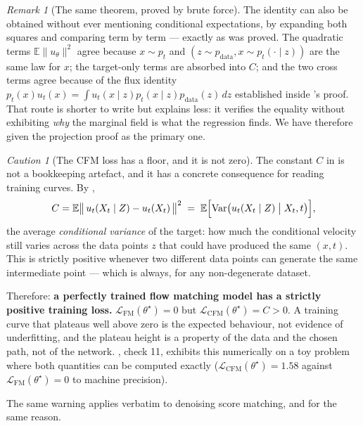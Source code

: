 \documentclass[11pt,a4paper]{report}
\theoremstyle{definition}
\theoremstyle{remark}
\newtheorem{remark}[remark]{Remark}
\newtheorem{caution}[caution]{Caution}
\DeclareMathOperator{\Var}{Var}
\newcommand{\EE}{\mathbb E}
\begin{document}
\begin{remark}[The same theorem, proved by brute force]
\label{rem:cfm-direct-proof}
The identity can also be obtained without ever mentioning conditional
expectations, by expanding both squares and comparing term by term ---
exactly as  was proved. The quadratic terms
$\EE\|u_\theta\|^2$ agree because $x\sim p_t$ and
$(z\sim p_{\mathrm{data}},x\sim p_t(\cdot\mid z))$ are the same law for
$x$; the target-only terms are absorbed into $C$; and the two cross terms
agree because of the flux identity
$p_t(x)u_t(x)=\int u_t(x\mid z)p_t(x\mid z)p_{\mathrm{data}}(z)\,dz$
established inside 's proof. That
route is shorter to write but explains less: it verifies the equality
without exhibiting \emph{why} the marginal field is what the regression
finds. We have therefore given the projection proof as the primary one.
\end{remark}

\begin{caution}[The CFM loss has a floor, and it is not zero]
\label{caution:cfm-floor}
The constant $C$ in  is not a bookkeeping
artefact, and it has a concrete consequence for reading training curves.
By ,
\[
C = \EE\bigl\|\,u_t(X_t\mid Z) - u_t(X_t)\,\bigr\|^2
\;=\;\EE\Bigl[\Var\bigl(u_t(X_t\mid Z)\;\big|\;X_t,t\bigr)\Bigr] ,
\]
the average \emph{conditional variance} of the target: how much the
conditional velocity still varies across the data points $z$ that could
have produced the same $(x,t)$. This is strictly positive whenever two
different data points can generate the same intermediate point --- which is
always, for any non-degenerate dataset.

Therefore: \textbf{a perfectly trained flow matching model has a strictly
positive training loss.} $\mathcal L_{\mathrm{FM}}(\theta^\star)=0$ but
$\mathcal L_{\mathrm{CFM}}(\theta^\star)=C>0$. A training curve that
plateaus well above zero is the expected behaviour, not evidence of
underfitting, and the plateau height is a property of the data and the
chosen path, not of the network. , check 11, exhibits
this numerically on a toy problem where both quantities can be computed
exactly ($\mathcal L_{\mathrm{CFM}}(\theta^\star)=1.58$ against
$\mathcal L_{\mathrm{FM}}(\theta^\star)=0$ to machine precision).

The same warning applies verbatim to denoising score matching, and for the
same reason.
\end{caution}
\end{document}
